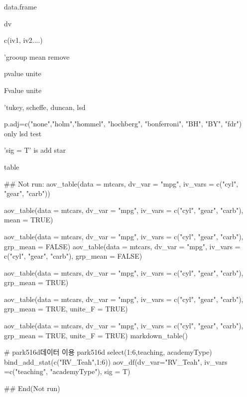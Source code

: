 \documentclass[a4paper]{book}
\begin{document}
%
\begin{Arguments}
\begin{ldescription}
\item[\code{data}] data.frame

\item[\code{dv\_var}] dv

\item[\code{iv\_vars}] c(iv1, iv2....)

\item[\code{grp\_mean}] 'grooup mean remove

\item[\code{unite\_p}] pvalue unite

\item[\code{unite\_F}] Fvalue unite

\item[\code{posthoc}] 'tukey, scheffe, duncan, lsd

\item[\code{p.adj}] p.adj=c("none","holm","hommel", "hochberg", "bonferroni", "BH", "BY", "fdr") only lsd test

\item[\code{sig}] 'sig = T' is add star
\end{ldescription}
\end{Arguments}
%
\begin{Value}
table
\end{Value}
%
\begin{Examples}
\begin{ExampleCode}

## Not run: 
aov_table(data = mtcars, dv_var = "mpg",
iv_vars = c("cyl", "gear", "carb"))

aov_table(data = mtcars, dv_var = "mpg",
iv_vars = c("cyl", "gear", "carb"),
           mean = TRUE)

aov_table(data = mtcars, dv_var = "mpg",
iv_vars = c("cyl", "gear", "carb"), grp_mean = FALSE)
aov_table(data = mtcars, dv_var = "mpg",
iv_vars = c("cyl", "gear", "carb"), grp_mean = FALSE) %


aov_table(data = mtcars, dv_var = "mpg",
iv_vars = c("cyl", "gear", "carb"),
 grp_mean = TRUE)

aov_table(data = mtcars, dv_var = "mpg",
 iv_vars = c("cyl", "gear", "carb"),
 grp_mean = TRUE, unite_F = TRUE)

aov_table(data = mtcars, dv_var = "mpg",
iv_vars = c("cyl", "gear", "carb"),
 grp_mean = TRUE, unite_F = TRUE) %
  markdown_table()

# park516d데이터 이용
park516d %
  select(1:6,teaching, academyType) %
  bind_add_stat(c("RV_Teah",1:6)) %
  aov_df(dv_var="RV_Teah",
         iv_vars =c("teaching", "academyType"), sig = T)



## End(Not run)


\end{ExampleCode}
\end{Examples}
\end{document}
